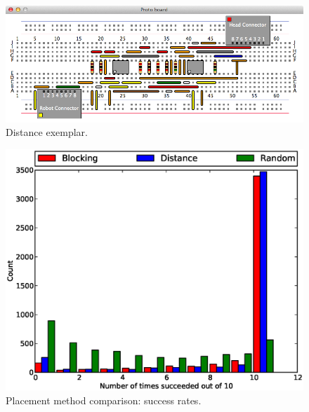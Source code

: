 \begin{figure}[H]
\begin{center}
\includegraphics[width=\textwidth]{Images/exemplar_distance.png}
\caption{Distance exemplar.}
\end{center}
\end{figure}

\begin{figure}[H]
\begin{center}
\includegraphics[width=\textwidth]{Images/placement_success_comparison.eps}
\caption{Placement method comparison: success rates.}
\label{fig:placement_success}
\end{center}
\end{figure}

